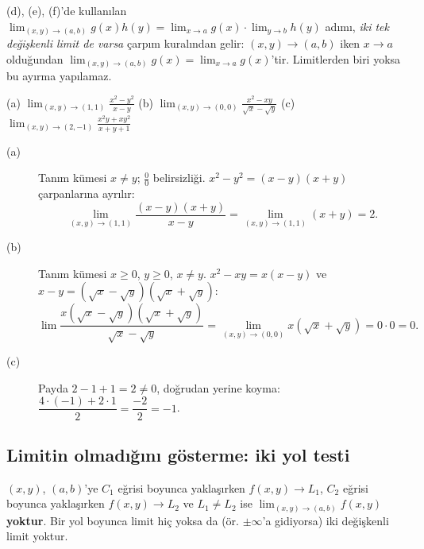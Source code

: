 \begin{bilgi}
(d), (e), (f)'de kullanılan $\lim_{(x,y)\to(a,b)}g(x)h(y)=\lim_{x\to a}g(x)\cdot\lim_{y\to b}h(y)$ adımı, \emph{iki
tek değişkenli limit de varsa} çarpım kuralından gelir: $(x,y)\to(a,b)$ iken $x\to a$ olduğundan
$\lim_{(x,y)\to(a,b)}g(x)=\lim_{x\to a}g(x)$'tir. Limitlerden biri yoksa bu ayırma yapılamaz.
\end{bilgi}

\begin{soru}
(a) $\displaystyle\lim_{(x,y)\to(1,1)}\frac{x^2-y^2}{x-y}$ \qquad
(b) $\displaystyle\lim_{(x,y)\to(0,0)}\frac{x^2-xy}{\sqrt x-\sqrt y}$ \qquad
(c) $\displaystyle\lim_{(x,y)\to(2,-1)}\frac{x^2y+xy^2}{x+y+1}$
\end{soru}
\begin{cevap}
\begin{description}
  \item[(a)] Tanım kümesi $x\neq y$; $\frac00$ belirsizliği. $x^2-y^2=(x-y)(x+y)$ çarpanlarına ayrılır:
  \[
  \lim_{(x,y)\to(1,1)}\frac{(x-y)(x+y)}{x-y}=\lim_{(x,y)\to(1,1)}(x+y)=2 .
  \]
  \item[(b)] Tanım kümesi $x\ge0$, $y\ge0$, $x\neq y$. $x^2-xy=x(x-y)$ ve $x-y=(\sqrt x-\sqrt y)(\sqrt x+\sqrt y)$:
  \[
  \lim\frac{x(\sqrt x-\sqrt y)(\sqrt x+\sqrt y)}{\sqrt x-\sqrt y}=\lim_{(x,y)\to(0,0)}x(\sqrt x+\sqrt y)=0\cdot0=0 .
  \]
  \item[(c)] Payda $2-1+1=2\neq0$, doğrudan yerine koyma:
  $\dfrac{4\cdot(-1)+2\cdot1}{2}=\dfrac{-2}{2}=-1$.
\end{description}
\end{cevap}

\subsection{Limitin olmadığını gösterme: iki yol testi}

\begin{teorem}
$(x,y)$, $(a,b)$'ye $C_1$ eğrisi boyunca yaklaşırken $f(x,y)\to L_1$, $C_2$ eğrisi boyunca yaklaşırken
$f(x,y)\to L_2$ ve $L_1\neq L_2$ ise $\displaystyle\lim_{(x,y)\to(a,b)}f(x,y)$ \textbf{yoktur}. Bir yol boyunca limit
hiç yoksa da (ör. $\pm\infty$'a gidiyorsa) iki değişkenli limit yoktur.
\end{teorem}

